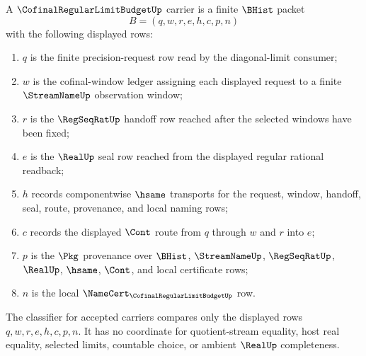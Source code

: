 \begin{definition}
\label{def:cofinal-regular-limit-budget-carrier}
A $\CofinalRegularLimitBudgetUp$ carrier is a finite $\BHist$ packet
$$
B=(q,w,r,e,h,c,p,n)
$$
with the following displayed rows:
\begin{enumerate}
\item $q$ is the finite precision-request row read by the diagonal-limit consumer;
\item $w$ is the cofinal-window ledger assigning each displayed request to a finite $\StreamNameUp$ observation window;
\item $r$ is the $\RegSeqRatUp$ handoff row reached after the selected windows have been fixed;
\item $e$ is the $\RealUp$ seal row reached from the displayed regular rational readback;
\item $h$ records componentwise $\hsame$ transports for the request, window, handoff, seal, route, provenance, and local naming rows;
\item $c$ records the displayed $\Cont$ route from $q$ through $w$ and $r$ into $e$;
\item $p$ is the $\Pkg$ provenance over $\BHist$, $\StreamNameUp$, $\RegSeqRatUp$, $\RealUp$, $\hsame$, $\Cont$, and local certificate rows;
\item $n$ is the local $\NameCert_{\CofinalRegularLimitBudgetUp}$ row.
\end{enumerate}
The classifier for accepted carriers compares only the displayed rows $q,w,r,e,h,c,p,n$. It has no coordinate for quotient-stream equality, host real equality, selected limits, countable choice, or ambient $\RealUp$ completeness.
\end{definition}

